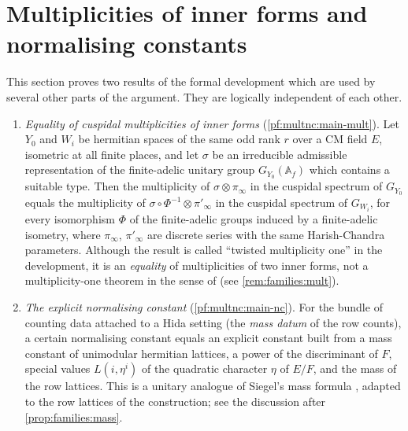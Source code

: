 \section{Multiplicities of inner forms and normalising constants}\label{sec:pf:multnc}

\providecommand{\multncAf}{\mathbb{A}_{f}}
\providecommand{\multncm}{m_{\mathrm{cusp}}}
\providecommand{\multncT}{\mathcal{T}}
\providecommand{\multncPhi}{\Phi}
\providecommand{\multncB}{\mathcal{B}}
\providecommand{\multncTy}{\mathfrak{T}}
\providecommand{\multncst}[1]{\textup{(#1)}}

This section proves two results of the formal development \cite{LeanSource2026} which are used by several other
parts of the argument. They are logically independent of each other.

\begin{enumerate}[label=(\Alph*)]
\item \emph{Equality of cuspidal multiplicities of inner forms} (\cref{pf:multnc:main-mult}). Let $Y_0$ and $W_i$ be
hermitian spaces of the same odd rank $r$ over a CM field $E$, isometric at all finite places, and let $\sigma$ be an
irreducible admissible representation of the finite-adelic unitary group $G_{Y_0}(\multncAf)$ which contains a
suitable type. Then the multiplicity of $\sigma\otimes\pi_\infty$ in the cuspidal spectrum of $G_{Y_0}$ equals the
multiplicity of $\sigma\circ\Phi^{-1}\otimes\pi'_\infty$ in the cuspidal spectrum of $G_{W_i}$, for every isomorphism
$\Phi$ of the finite-adelic groups induced by a finite-adelic isometry, where $\pi_\infty$, $\pi'_\infty$ are discrete
series with the same Harish-Chandra parameters. Although the result is called ``twisted multiplicity one'' in the
development, it is an \emph{equality} of multiplicities of two inner forms, not a multiplicity-one theorem in the sense of
\cite{AizenbudGourevitchRallisSchiffmann2010} (see \cref{rem:families:mult}).
\item \emph{The explicit normalising constant} (\cref{pf:multnc:main-nc}). For the bundle of counting data attached to a
Hida setting (the \emph{mass datum} of the row counts), a certain normalising constant equals an explicit constant built
from a mass constant of unimodular hermitian lattices, a power of the discriminant of $F$, special values
$L(i,\eta^i)$ of the quadratic character $\eta$ of $E/F$, and the mass of the row lattices. This is a unitary analogue
of Siegel's mass formula \cite{Siegel1935,GanHankeYu2001,Prasad1989}, adapted to the row lattices of the construction;
see the discussion after \cref{prop:families:mass}.
\end{enumerate}

